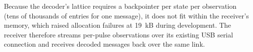 Because the decoder's lattice requires a backpointer per state per observation
(tens of thousands of entries for one message), it does not fit within the
receiver's memory, which raised allocation failures at 19~kB during development.
The receiver therefore streams per-pulse observations over its existing USB
serial connection and receives decoded messages back over the same link.
